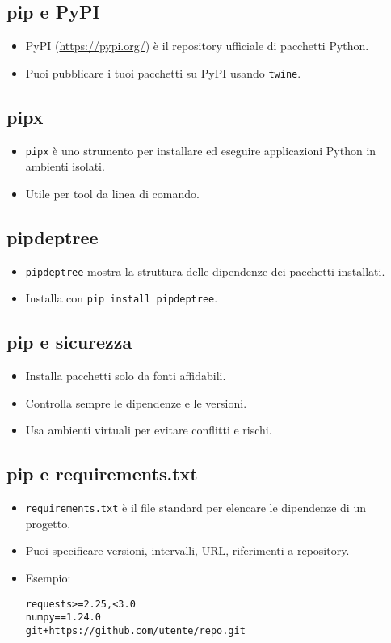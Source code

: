 \documentclass[a4paper,12pt]{article}
\begin{document}
\subsection*{pip e PyPI}
\begin{itemize}
    \item PyPI (\url{https://pypi.org/}) è il repository ufficiale di pacchetti Python.
    \item Puoi pubblicare i tuoi pacchetti su PyPI usando \texttt{twine}.
\end{itemize}

\subsection*{pipx}
\begin{itemize}
    \item \texttt{pipx} è uno strumento per installare ed eseguire applicazioni Python in ambienti isolati.
    \item Utile per tool da linea di comando.
\end{itemize}

\subsection*{pipdeptree}
\begin{itemize}
    \item \texttt{pipdeptree} mostra la struttura delle dipendenze dei pacchetti installati.
    \item Installa con \texttt{pip install pipdeptree}.
\end{itemize}

\subsection*{pip e sicurezza}
\begin{itemize}
    \item Installa pacchetti solo da fonti affidabili.
    \item Controlla sempre le dipendenze e le versioni.
    \item Usa ambienti virtuali per evitare conflitti e rischi.
\end{itemize}

\subsection*{pip e requirements.txt}
\begin{itemize}
    \item \texttt{requirements.txt} è il file standard per elencare le dipendenze di un progetto.
    \item Puoi specificare versioni, intervalli, URL, riferimenti a repository.
    \item Esempio:
\begin{lstlisting}
requests>=2.25,<3.0
numpy==1.24.0
git+https://github.com/utente/repo.git
    \end{lstlisting}
\end{itemize}
\end{document}
